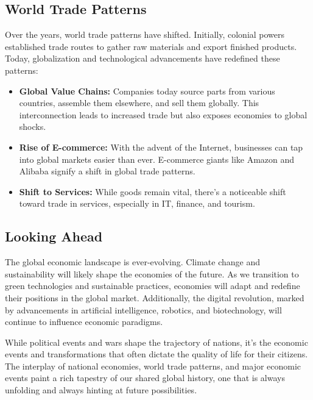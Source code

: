 \subsection*{World Trade Patterns}
Over the years, world trade patterns have shifted. Initially, colonial powers established trade routes to gather raw materials and export finished products. Today, globalization and technological advancements have redefined these patterns:
\begin{itemize}
    \item \textbf{Global Value Chains:} Companies today source parts from various countries, assemble them elsewhere, and sell them globally. This interconnection leads to increased trade but also exposes economies to global shocks.
    \item \textbf{Rise of E-commerce:} With the advent of the Internet, businesses can tap into global markets easier than ever. E-commerce giants like Amazon and Alibaba signify a shift in global trade patterns.
    \item \textbf{Shift to Services:} While goods remain vital, there's a noticeable shift toward trade in services, especially in IT, finance, and tourism.
\end{itemize}

\subsection*{Looking Ahead}
The global economic landscape is ever-evolving. Climate change and sustainability will likely shape the economies of the future. As we transition to green technologies and sustainable practices, economies will adapt and redefine their positions in the global market. Additionally, the digital revolution, marked by advancements in artificial intelligence, robotics, and biotechnology, will continue to influence economic paradigms.

While political events and wars shape the trajectory of nations, it's the economic events and transformations that often dictate the quality of life for their citizens. The interplay of national economies, world trade patterns, and major economic events paint a rich tapestry of our shared global history, one that is always unfolding and always hinting at future possibilities.

